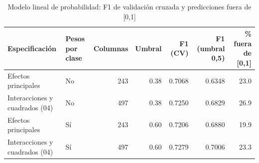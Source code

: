 \begin{table}

\caption{\label{tab:lpm}Modelo lineal de probabilidad: F1 de validación cruzada y predicciones fuera de [0,1]}
\centering
\begin{tabular}[t]{llrrrrr}
\toprule
Especificación & Pesos por clase & Columnas & Umbral & F1 (CV) & F1 (umbral 0,5) & \% fuera de [0,1]\\
\midrule
Efectos principales & No & 243 & 0.38 & 0.7068 & 0.6348 & 23.0\\
Interacciones y cuadrados (04) & No & 497 & 0.38 & 0.7250 & 0.6829 & 26.9\\
Efectos principales & Sí & 243 & 0.60 & 0.7206 & 0.6880 & 19.9\\
Interacciones y cuadrados (04) & Sí & 497 & 0.60 & 0.7279 & 0.7006 & 23.3\\
\bottomrule
\end{tabular}
\end{table}
